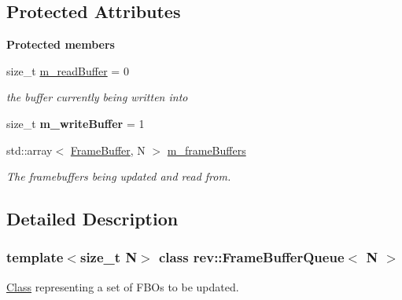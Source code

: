 \subsection*{Protected Attributes}
\begin{Indent}\textbf{ Protected members}\par
\begin{DoxyCompactItemize}
\item 
\mbox{\label{classrev_1_1_frame_buffer_queue_a1281e0018321a3debda97aac189a2d61}} 
size\+\_\+t \mbox{\hyperlink{classrev_1_1_frame_buffer_queue_a1281e0018321a3debda97aac189a2d61}{m\+\_\+read\+Buffer}} = 0
\begin{DoxyCompactList}\small\item\em the buffer currently being written into \end{DoxyCompactList}\item 
\mbox{\label{classrev_1_1_frame_buffer_queue_aeddf2a193d6dd9ef4810c74d7b1040d1}} 
size\+\_\+t {\bfseries m\+\_\+write\+Buffer} = 1
\item 
\mbox{\label{classrev_1_1_frame_buffer_queue_ac18becfd02895ec9cc3979d7b5d13bee}} 
std\+::array$<$ \mbox{\hyperlink{classrev_1_1_frame_buffer}{Frame\+Buffer}}, N $>$ \mbox{\hyperlink{classrev_1_1_frame_buffer_queue_ac18becfd02895ec9cc3979d7b5d13bee}{m\+\_\+frame\+Buffers}}
\begin{DoxyCompactList}\small\item\em The framebuffers being updated and read from. \end{DoxyCompactList}\end{DoxyCompactItemize}
\end{Indent}


\subsection{Detailed Description}
\subsubsection*{template$<$size\+\_\+t N$>$\newline
class rev\+::\+Frame\+Buffer\+Queue$<$ N $>$}

\mbox{\hyperlink{struct_class}{Class}} representing a set of F\+B\+Os to be updated. 

